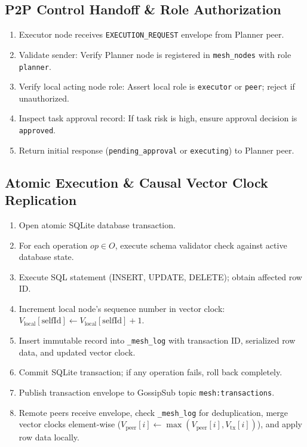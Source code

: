\documentclass[12pt,a4paper]{report}
\begin{document}
\subsection{P2P Control Handoff \& Role Authorization}
\begin{enumerate}[label=\arabic*.,leftmargin=*,itemsep=2pt]
    \item Executor node receives \texttt{EXECUTION\_REQUEST} envelope from Planner peer.
    \item Validate sender: Verify Planner node is registered in \texttt{mesh\_nodes} with role \texttt{planner}.
    \item Verify local acting node role: Assert local role is \texttt{executor} or \texttt{peer}; reject if unauthorized.
    \item Inspect task approval record: If task risk is high, ensure approval decision is \texttt{approved}.
    \item Return initial response (\texttt{pending\_approval} or \texttt{executing}) to Planner peer.
\end{enumerate}

\subsection{Atomic Execution \& Causal Vector Clock Replication}
\begin{enumerate}[label=\arabic*.,leftmargin=*,itemsep=2pt]
    \item Open atomic SQLite database transaction.
    \item For each operation $op \in O$, execute schema validator check against active database state.
    \item Execute SQL statement (INSERT, UPDATE, DELETE); obtain affected row ID.
    \item Increment local node's sequence number in vector clock: $V_{\text{local}}[\text{selfId}] \leftarrow V_{\text{local}}[\text{selfId}] + 1$.
    \item Insert immutable record into \texttt{\_mesh\_log} with transaction ID, serialized row data, and updated vector clock.
    \item Commit SQLite transaction; if any operation fails, roll back completely.
    \item Publish transaction envelope to GossipSub topic \texttt{mesh:transactions}.
    \item Remote peers receive envelope, check \texttt{\_mesh\_log} for deduplication, merge vector clocks element-wise ($V_{\text{peer}}[i] \leftarrow \max(V_{\text{peer}}[i], V_{\text{tx}}[i])$), and apply row data locally.
\end{enumerate}
\end{document}
